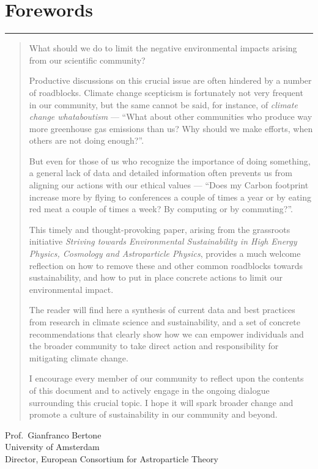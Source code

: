 \documentclass[../SustainableHEP.tex]{subfiles}
\begin{document}
\RaggedRight
\sloppy
\newpage


\section*{Forewords}
\label{sec:Forewords}

\textcolor{Pythongreen}{\rule{2cm}{3pt}}

\begin{quotation}
What should we do to limit the negative environmental impacts arising from our scientific community?
 
Productive discussions on this crucial issue are often hindered by a number of roadblocks. Climate change scepticism is fortunately not very frequent in our community, but the same cannot be said, for instance, of \textit{climate change whataboutism}  ---  ``What about other communities who produce way more greenhouse gas emissions than us? Why should we make efforts, when others are not doing enough?''. 

But even for those of us who recognize the importance of doing something, a general lack of data and detailed information often prevents us from aligning our actions with our ethical values --- ``Does my Carbon footprint increase more by flying to conferences a couple of times a year or by eating red meat a couple of times a week? By computing or by commuting?''.
 
This timely and thought-provoking paper, arising from the grassroots initiative \textit{Striving
towards Environmental Sustainability in High Energy Physics, Cosmology and
Astroparticle Physics}, provides a much welcome reflection on how to remove these and other common roadblocks towards sustainability, and how to put in place concrete actions to limit our environmental impact.
 
The reader will find here a synthesis of current data and best practices from research in climate science and sustainability, and a set of concrete recommendations that clearly show how we can empower individuals and the broader community to take direct action and responsibility for mitigating climate change.
 
I encourage every member of our community to reflect upon the contents of this document and to actively engage in the ongoing dialogue surrounding this crucial topic. I hope it will spark broader change and promote a culture of sustainability in our community and beyond.
\end{quotation}
\begin{flushleft}
Prof.\ Gianfranco Bertone\\
University of Amsterdam\\
Director, European Consortium for Astroparticle Theory
\end{flushleft}
\end{document}
